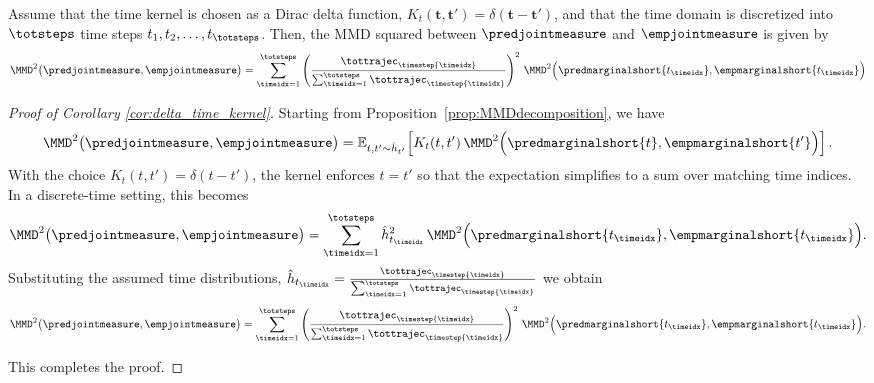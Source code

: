 \begin{myCorollary}
\label{cor:delta_time_kernel}
Assume that the time kernel is chosen as a Dirac delta function, $K_t(\bm{t}, \bm{t}') = \delta(\bm{t} - \bm{t}')$, and that the time domain is discretized into $\totsteps$ time steps $t_1, t_2, \dots, t_{\totsteps}$. Then, the MMD squared between $\predjointmeasure$ and $\empjointmeasure$ is given by
\begin{align*}
    \MMD^2\big(\predjointmeasure, \empjointmeasure\big)
=\sum_{\timeidx=1}^{\totsteps} \left(\frac{\tottrajec_{\timestep{\timeidx}}}{\sum_{\timeidx=1}^{\totsteps}\tottrajec_{\timestep{\timeidx}}}\right)^2\,\MMD^2\Big(\predmarginalshort{t_{\timeidx}}, \empmarginalshort{t_{\timeidx}}\Big)
\end{align*}
\end{myCorollary}

\begin{proof}[Proof of Corollary \ref{cor:delta_time_kernel}]
Starting from Proposition~\ref{prop:MMDdecomposition}, we have
\[
\MMD^2\big(\predjointmeasure, \empjointmeasure\big)
=\mathbb{E}_{t, t' \sim \hat{h}_{t'}}\!\left[K_t(t, t')\,\MMD^2\Big(\predmarginalshort{t}, \empmarginalshort{t'}\Big)\right].
\]
With the choice \(K_t(t,t') = \delta(t-t')\), the kernel enforces \(t = t'\) so that the expectation simplifies to a sum over matching time indices. In a discrete-time setting, this becomes
\[
\MMD^2\big(\predjointmeasure, \empjointmeasure\big)
=\sum_{\timeidx=1}^{\totsteps} \hat{h}_{t_{\timeidx}}^2\,\MMD^2\Big(\predmarginalshort{t_{\timeidx}}, \empmarginalshort{t_{\timeidx}}\Big).
\]
Substituting the assumed time distributions, $\hat{h}_{t_{\timeidx}} = \frac{\tottrajec_{\timestep{\timeidx}}}{\sum_{\timeidx=1}^{\totsteps}\tottrajec_{\timestep{\timeidx}}}$
we obtain
\begin{align*}
   \MMD^2\big(\predjointmeasure, \empjointmeasure\big)
=\sum_{\timeidx=1}^{\totsteps} \left(\frac{\tottrajec_{\timestep{\timeidx}}}{\sum_{\timeidx=1}^{\totsteps}\tottrajec_{\timestep{\timeidx}}}\right)^2\,\MMD^2\Big(\predmarginalshort{t_{\timeidx}}, \empmarginalshort{t_{\timeidx}}\Big). 
\end{align*}

This completes the proof.
\end{proof}